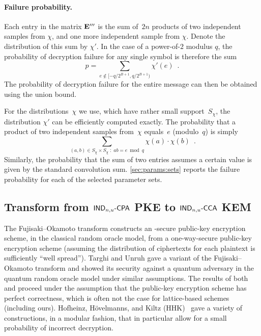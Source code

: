 \paragraph{Failure probability.}

Each entry in the matrix $\mathbf{E}'''$ is the sum of~$2n$ products of two
independent samples from $\chi$, and one more independent sample from
$\chi$. Denote the distribution of this sum by $\chi'$. In the case of
a power-of-$2$ modulus $q$, the probability of decryption failure for
any single symbol is therefore the sum
\[ p = \sum_{e \notin [-q/2^{B+1},q/2^{B+1})}\chi'(e) \enspace. \]
The probability of decryption failure for the entire message can then
be obtained using the union bound.

For the distributions~$\chi$ we use, which have rather small
support~$S_{\chi}$, the distribution $\chi'$ can be efficiently
computed exactly. The probability that a product of two independent
samples from~$\chi$ equals~$e$ (modulo~$q$) is simply
\[ \sum_{(a,b)\in S_\chi\times S_\chi\; :\; a b = e \bmod q}
  \chi(a)\cdot \chi(b) \enspace. \] Similarly, the probability that
the sum of two entries assumes a certain value is given by the
standard convolution sum.  \autoref{sec:params:sets} reports the
failure probability for each of the selected parameter sets.

\subsection{Transform from $\textsf{\upshape\mdseries IND}_{n,u}\text{-}\textsf{\upshape\mdseries CPA}$ PKE to $\textsf{\upshape\mdseries IND}_{n,u}\text{-}\textsf{\upshape\mdseries CCA}$ KEM}\label{sec:cca-transform}

The Fujisaki--Okamoto transform \cite{C:FujOka99} constructs an \INDCCATwo-secure public-key encryption scheme, in the classical random oracle model, from a one-way-secure public-key encryption scheme (assuming the distribution of ciphertexts for each plaintext is sufficiently ``well spread'').
Targhi and Unruh \cite{TCC:TarUnr16} gave a variant of the Fujisaki--Okamoto transform and showed its \INDCCATwo security against a quantum adversary in the quantum random oracle model under similar assumptions.
The results of both \cite{C:FujOka99} and \cite{TCC:TarUnr16} proceed under the assumption that the public-key encryption scheme has perfect correctness, which is often not the case for lattice-based schemes (including ours).
Hofheinz, H{\" o}velmanns, and Kiltz (HHK)~\cite{TCC:HofHovKil17} gave a variety of constructions, in a modular fashion, that in particular allow for a small probability of incorrect decryption.

